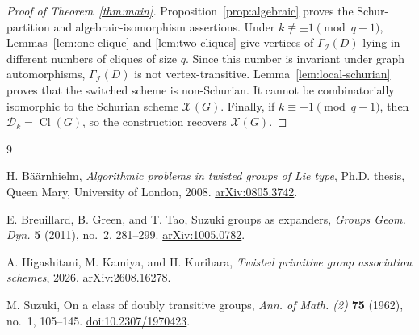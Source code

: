 \documentclass[11pt]{amsart}
\numberwithin{equation}{section}
\theoremstyle{definition}
\theoremstyle{remark}
\newcommand{\Cl}{\operatorname{Cl}}
\newcommand{\X}{\mathcal X}
\newcommand{\D}{\mathcal D}
\newcommand{\I}{\mathcal I}
\begin{document}
\begin{proof}[Proof of Theorem~\ref{thm:main}]
Proposition~\ref{prop:algebraic} proves the Schur-partition and algebraic-isomorphism assertions. 
Under $k\not\equiv\pm1\pmod{q-1}$, Lemmas~\ref{lem:one-clique} and \ref{lem:two-cliques} give vertices of $\Gamma_{\I}(D)$ lying in different numbers of cliques of size $q$. 
Since this number is invariant under graph automorphisms, $\Gamma_{\I}(D)$ is not vertex-transitive.
Lemma~\ref{lem:local-schurian} proves that the switched scheme is non-Schurian. 
It cannot be combinatorially isomorphic to the Schurian scheme $\X(G)$. 
Finally, if $k\equiv\pm1\pmod{q-1}$, then $\D_k=\Cl(G)$, so the construction recovers $\X(G)$. 
\end{proof}

\begin{thebibliography}{9}

H. B\"a\"arnhielm,
\emph{Algorithmic problems in twisted groups of Lie type},
Ph.D. thesis, Queen Mary, University of London, 2008.
\href{https://arxiv.org/abs/0805.3742}{arXiv:0805.3742}.

E. Breuillard, B. Green, and T. Tao,
Suzuki groups as expanders,
\emph{Groups Geom. Dyn.} \textbf{5} (2011), no.~2, 281--299.
\href{https://arxiv.org/abs/1005.0782}{arXiv:1005.0782}.

A. Higashitani, M. Kamiya, and H. Kurihara,
\emph{Twisted primitive group association schemes}, 2026.
\href{https://arxiv.org/abs/2608.16278}{arXiv:2608.16278}.

M. Suzuki,
On a class of doubly transitive groups,
\emph{Ann. of Math. (2)} \textbf{75} (1962), no.~1, 105--145.
\href{https://doi.org/10.2307/1970423}{doi:10.2307/1970423}.

\end{thebibliography}
\end{document}
